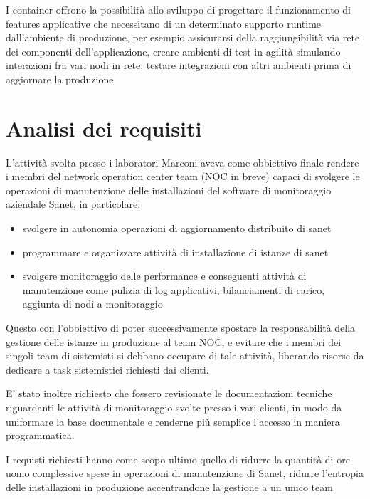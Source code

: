 \documentclass[12pt,a4paper,twoside,openright]{book}
\begin{document}
I container offrono la possibilità allo sviluppo di progettare il funzionamento di features applicative che necessitano di un determinato supporto runtime dall'ambiente di produzione, per esempio assicurarsi della raggiungibilità via rete dei componenti dell'applicazione, creare ambienti di test in agilità simulando interazioni fra vari nodi in rete, testare integrazioni con altri ambienti prima di aggiornare la produzione

\chapter{Analisi dei requisiti}

L'attività svolta presso i laboratori Marconi aveva come obbiettivo finale rendere i membri del network operation center team (NOC in breve) capaci di svolgere le operazioni di manutenzione delle installazioni del software di monitoraggio aziendale Sanet, in particolare:

\begin{itemize}
\item svolgere in autonomia operazioni di aggiornamento distribuito di sanet
\item programmare e organizzare attività di installazione di istanze di sanet
\item svolgere monitoraggio delle performance e conseguenti attività di manutenzione come pulizia di log applicativi, bilanciamenti di carico, aggiunta di nodi a monitoraggio
\end{itemize}

Questo con l'obbiettivo di poter successivamente spostare la responsabilità della gestione delle istanze in produzione al team NOC, e evitare che i membri dei singoli team di sistemisti si debbano occupare di tale attività, liberando risorse da dedicare a task sistemistici richiesti dai clienti.

E' stato inoltre richiesto che fossero revisionate le documentazioni tecniche riguardanti le attività di monitoraggio svolte presso i vari clienti, in modo da uniformare la base documentale e renderne più semplice l'accesso in maniera programmatica.

I requisti richiesti hanno come scopo ultimo quello di ridurre la quantità di ore uomo complessive spese in operazioni di manutenzione di Sanet, ridurre l'entropia delle installazioni in produzione accentrandone la gestione a un unico team
\end{document}
